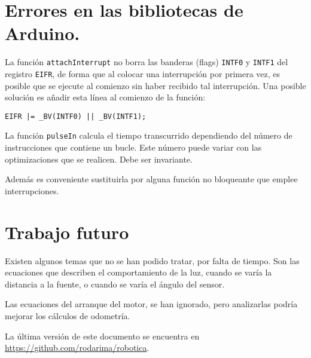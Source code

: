 \documentclass[10pt,a4paper,hidelinks,twocolumn]{article}
\begin{document}
\section{Errores en las bibliotecas de Arduino.}

La función \texttt{attachInterrupt} no borra las banderas (flags) \texttt{INTF0} 
y \texttt{INTF1} del registro \texttt{EIFR}, de forma que al colocar una 
interrupción por primera vez, es posible que se ejecute al comienzo sin haber 
recibido tal interrupción. Una posible solución es añadir esta línea al comienzo 
de la función:

\texttt{EIFR |= \_BV(INTF0) || \_BV(INTF1);}

La función \texttt{pulseIn} calcula el tiempo transcurrido dependiendo del 
número de instrucciones que contiene un bucle. Este número puede variar con las 
optimizaciones que se realicen. Debe ser invariante.

Además es conveniente sustituirla por alguna función no bloqueante que emplee 
interrupciones.

\section{Trabajo futuro}
Existen algunos temas que no se han podido tratar, por falta de tiempo. Son las 
ecuaciones que describen el comportamiento de la luz, cuando se varía la 
distancia a la fuente, o cuando se varía el ángulo del sensor.

Las ecuaciones del arranque del motor, se han ignorado, pero analizarlas podría 
mejorar los cálculos de odometría.

La última versión de este documento se encuentra en 
\url{https://github.com/rodarima/robotica}.
\clearpage
\end{document}
